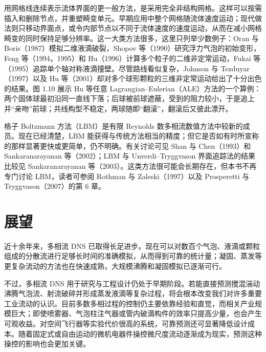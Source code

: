 \documentclass[11pt,a4paper,openany,fontset=none]{ctexbook}
\newenvironment{sourceblock}
  {\par\addvspace{0.65\baselineskip}\noindent\begin{minipage}{\linewidth}\centering}
  {\end{minipage}\par\addvspace{0.48\baselineskip}}
\begin{document}
用网格线连续表示流体界面的更一般方法，是采用完全非结构网格。这样可以按需插入和删除节点，并重塑畸变单元。早期应用中整个网格随流体速度运动；现代做法则只移动界面点，或令内部节点以不同于流体速度的速度运动，从而在减小网格畸变的同时保持足够分辨率。这一大类方法很多，这里只列举少数例子：Oran 与 Boris（1987）模拟二维液滴破裂，Shopov 等（1990）研究浮力气泡的初始变形，Feng 等（1994，1995）和 Hu（1996）计算多个粒子的二维非定常运动，Fukai 等（1995）追踪单个轴对称液滴撞壁。尽管路线看似复杂，Johnson 与 Tezduyar（1997）以及 Hu 等（2001）却对多个球形颗粒的三维非定常运动给出了十分出色的结果。图 1.10 展示 Hu 等任意 Lagrangian--Eulerian（ALE）方法的一个算例：两个固体球最初沿同一直线下落；后球被前球遮蔽，受到的阻力较小，于是追上并“亲吻”前球；共线构型不稳定，两球随即“翻滚”，翻滚后又彼此漂开。

\begin{sourceblock}
\end{sourceblock}

格子 Boltzmann 方法（LBM）是有限 Reynolds 数多相流数值方法中较新的成员。现在已经清楚，LBM 能获得与传统方法相当的精度；但它是否如有时所宣称的那样显著更快或更简单，仍不明确。有关讨论可见 Shan 与 Chen（1993）和 Sankaranarayanan 等（2002）；LBM 与 Unverdi--Tryggvason 界面追踪法的结果比较见 Sankaranarayanan 等（2003）。这类方法很可能会长期存在，但本书不再专门讨论 LBM，读者可参阅 Rothman 与 Zaleski（1997）以及 Prosperetti 与 Tryggvason（2007）的第 6 章。

\section{展望}


近十余年来，多相流 DNS 已取得长足进步。现在可以对数百个气泡、液滴或颗粒组成的分散流进行足够长时间的准确模拟，从而得到可靠的统计量；凝固、蒸发等更复杂流动的方法也在快速成熟，大规模沸腾和凝固模拟已逐渐可行。

不过，多相流 DNS 用于研究与工程设计仍处于早期阶段。若能直接预测搅混湍动沸腾气泡流、射流破碎并形成蒸发液滴等复杂过程，将会根本改变我们对许多重要工业流动的认识。目前多数多相过程的控制仍主要依靠经验和直觉，而相关产业规模巨大；即使喷雾器、气泡柱注气器或管内破滴构件的效率只提高少量，也会产生可观收益。对空间飞行器等实验代价很高的系统，可靠预测还可显著降低设计成本。随着固定式或自由运动的微机电器件操控微尺度流动逐渐成为现实，预测这种操控的影响也会更加关键。
\end{document}
